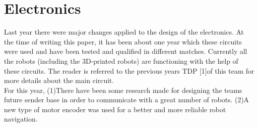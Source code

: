 \section{Electronics}
\setlength\intextsep{0pt}
Last year there were major changes applied to the design of the electronics. At the time of writing this paper, it has been about one year which these circuits were used and have been tested and qualified in different matches. Currently all the robots (including the 3D-printed robots) are functioning with the help of these circuits. The reader is referred to the previous years TDP [1]of this team for more details about the main circuit.\\
For this year, (1)There have been some research made for designing the teams future sender base in order to communicate with a great number of robots. (2)A new type of motor encoder was used for a better and more reliable robot navigation.

